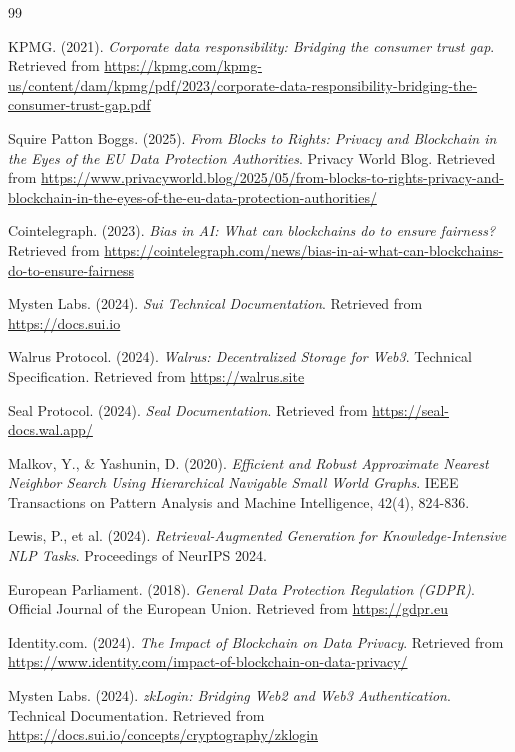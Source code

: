 \documentclass[12pt, a4paper]{article}
\begin{document}
\newpage
\begin{thebibliography}{99}

KPMG. (2021). \textit{Corporate data responsibility: Bridging the consumer trust gap}. Retrieved from \url{https://kpmg.com/kpmg-us/content/dam/kpmg/pdf/2023/corporate-data-responsibility-bridging-the-consumer-trust-gap.pdf}

Squire Patton Boggs. (2025). \textit{From Blocks to Rights: Privacy and Blockchain in the Eyes of the EU Data Protection Authorities}. Privacy World Blog. Retrieved from \url{https://www.privacyworld.blog/2025/05/from-blocks-to-rights-privacy-and-blockchain-in-the-eyes-of-the-eu-data-protection-authorities/}

Cointelegraph. (2023). \textit{Bias in AI: What can blockchains do to ensure fairness?} Retrieved from \url{https://cointelegraph.com/news/bias-in-ai-what-can-blockchains-do-to-ensure-fairness}

Mysten Labs. (2024). \textit{Sui Technical Documentation}. Retrieved from \url{https://docs.sui.io}

Walrus Protocol. (2024). \textit{Walrus: Decentralized Storage for Web3}. Technical Specification. Retrieved from \url{https://walrus.site}

Seal Protocol. (2024). \textit{Seal Documentation}. Retrieved from \url{https://seal-docs.wal.app/}

Malkov, Y., \& Yashunin, D. (2020). \textit{Efficient and Robust Approximate Nearest Neighbor Search Using Hierarchical Navigable Small World Graphs}. IEEE Transactions on Pattern Analysis and Machine Intelligence, 42(4), 824-836.

Lewis, P., et al. (2024). \textit{Retrieval-Augmented Generation for Knowledge-Intensive NLP Tasks}. Proceedings of NeurIPS 2024.

European Parliament. (2018). \textit{General Data Protection Regulation (GDPR)}. Official Journal of the European Union. Retrieved from \url{https://gdpr.eu}

Identity.com. (2024). \textit{The Impact of Blockchain on Data Privacy}. Retrieved from \url{https://www.identity.com/impact-of-blockchain-on-data-privacy/}

Mysten Labs. (2024). \textit{zkLogin: Bridging Web2 and Web3 Authentication}. Technical Documentation. Retrieved from \url{https://docs.sui.io/concepts/cryptography/zklogin}


\end{thebibliography}
\end{document}

